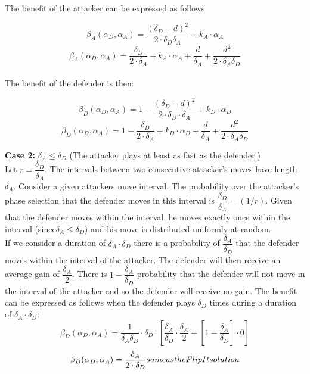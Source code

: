 The benefit of the attacker can be expressed as follows

\begin{equation}\label{first}
\beta_{A}(\alpha_{D},\alpha_{A}) = \dfrac { (\delta_{D}-d) ^{2}} {2 \cdot \delta_{D}  \delta_{A}} + k_{A} \cdot \alpha_{A}
\end{equation}
\begin{equation}\label{first}
\beta_{A}(\alpha_{D},\alpha_{A}) = \dfrac { \delta_{D}} {2 \cdot \delta_{A}} + k_{A} \cdot \alpha_{A} + \dfrac{d}{\delta_{A}} + \dfrac{d^{2}}{2 \cdot \delta_{A} \delta_{D}}
\end{equation}
\\

The benefit of the defender is then:

\begin{equation}\label{first}
\beta_{D}(\alpha_{D},\alpha_{A}) = 1 - \dfrac { (\delta_{D}-d) ^{2}} {2 \cdot \delta_{D} \cdot \delta_{A}} + k_{D} \cdot \alpha_{D}
\end{equation}
\begin{equation}\label{first}
\beta_{D}(\alpha_{D},\alpha_{A}) = 1 - \dfrac { \delta_{D}} {2 \cdot \delta_{A}} + k_{D} \cdot \alpha_{D} + \dfrac{d}{\delta_{A}} + \dfrac{d^{2}}{2 \cdot \delta_{A} \delta_{D}}
\end{equation}


\textbf{Case 2:} $\delta_{A} \leq \delta_{D} $ (The attacker plays at least as fast as the defender.) \\

Let $r = \dfrac{\delta_{D}}{ \delta_{A} }$. The intervals between two consecutive attacker's moves have length $\delta_{A}$. Consider a given attackers move interval. The probability over the attacker's phase selection that the defender moves in this interval is $\dfrac{\delta_{D}}{ \delta_{A} } = (1/r)$. Given that the defender moves within the interval, he moves exactly once within the interval (since$\delta_{A} \leq \delta_{D} $) and his move is distributed uniformly at random. \\

If we consider a duration of $\delta_{A} \cdot \delta_{D} $ there is a probability of $\dfrac{\delta_{A} } {\delta_{D}} $ that the defender moves within the interval of the attacker. The defender will then receive an average gain of $\dfrac{\delta_{A}} {2} $. There is $1- \dfrac{\delta_{A} } {\delta_{D}} $ probability that the defender will not move in the interval of the attacker and so the defender will receive no gain. The benefit can be expressed as follows when the  defender plays $\delta_{D}$ times during a duration of $\delta_{A} \cdot \delta_{D}$:
\begin{equation}\label{first}
\beta_{D}(\alpha_{D},\alpha_{A}) = \dfrac { 1} {\delta_{A} \delta_{D}} \cdot \delta_{D} \cdot [ \dfrac{\delta_{A}}{\delta_{D}} \cdot \dfrac{\delta_{A}}{2}+[ 1-\dfrac{\delta_{A}}{ \delta_{D}}] \cdot 0 ]
\end{equation}
\begin{equation}\label{first}
\beta_{D}(\alpha_{D},\alpha_{A}) = \dfrac {\delta_{A} }{2 \cdot \delta_{D}} $$same as the FlipIt solution$$
\end{equation}

